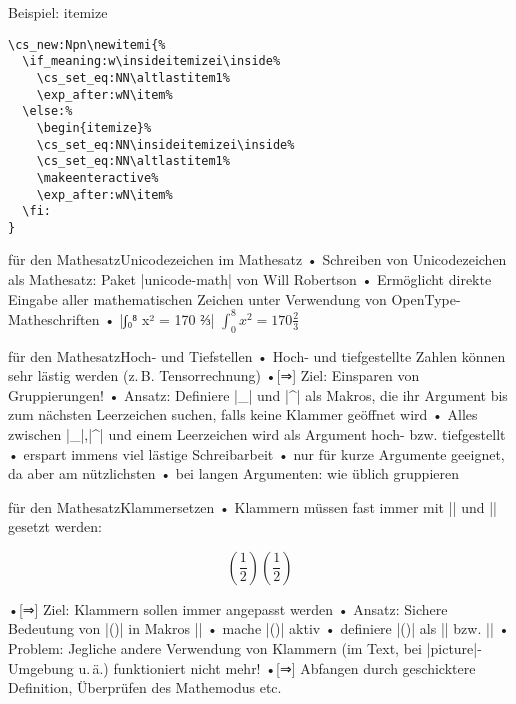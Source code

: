 \documentclass[t]{beamer}
\begin{document}
\begin{frame}[fragile]{Beispiel: itemize}
\begin{verbatim}
\cs_new:Npn\newitemi{%
  \if_meaning:w\insideitemizei\inside%
    \cs_set_eq:NN\altlastitem1%
    \exp_after:wN\item%
  \else:%
    \begin{itemize}%
    \cs_set_eq:NN\insideitemizei\inside%
    \cs_set_eq:NN\altlastitem1%
    \makeenteractive%
    \exp_after:wN\item%
  \fi:
}
\end{verbatim}
\end{frame}

\begin{frame}[fragile]{\altTeX für den Mathesatz}{Unicodezeichen im Mathesatz}
• Schreiben von Unicodezeichen als Mathesatz: Paket |unicode-math| von Will Robertson\pause
• Ermöglicht direkte Eingabe aller mathematischen Zeichen unter Verwendung von OpenType-Matheschriften
• |∫₀⁸ x² = 170 ⅔| $\int _0^8 x^2 = 170 \frac23$
\•
\end{frame}

\begin{frame}[fragile]{\altTeX für den Mathesatz}{Hoch- und Tiefstellen}
• Hoch- und tiefgestellte Zahlen können sehr lästig werden (z.\,B. Tensorrechnung)
•[⇒] Ziel: Einsparen von Gruppierungen!
• Ansatz: Definiere |_| und |^| als Makros, die ihr Argument bis zum nächsten Leerzeichen suchen, falls keine Klammer geöffnet wird
• Alles zwischen |_|,|^| und einem Leerzeichen wird als Argument hoch- bzw. tiefgestellt
• erspart immens viel lästige Schreibarbeit
• nur für kurze Argumente geeignet, da aber am nützlichsten
• bei langen Argumenten: wie üblich gruppieren
\•
\end{frame}

\begin{frame}[fragile]{\altTeX für den Mathesatz}{Klammersetzen}
• Klammern müssen fast immer mit |\left| und |\right| gesetzt werden:
\•
\begin{LTXexample}[pos=b,preset={\centering}]
\[(\frac 12) \left(\frac 12 \right)\]
\end{LTXexample}
•[⇒] Ziel: Klammern sollen immer angepasst werden
• Ansatz: Sichere Bedeutung von |()| in Makros |\openbrace \closebrace|
• mache |()| aktiv
• definiere |()| als |\left\openbrace| bzw. |\right\openbrace|\pause
• Problem: Jegliche andere Verwendung von Klammern (im Text, bei |picture|-Umgebung u.\,ä.) funktioniert nicht mehr!
•[⇒] Abfangen durch geschicktere Definition, Überprüfen des Mathemodus etc.
\•
\end{frame}
\end{document}

